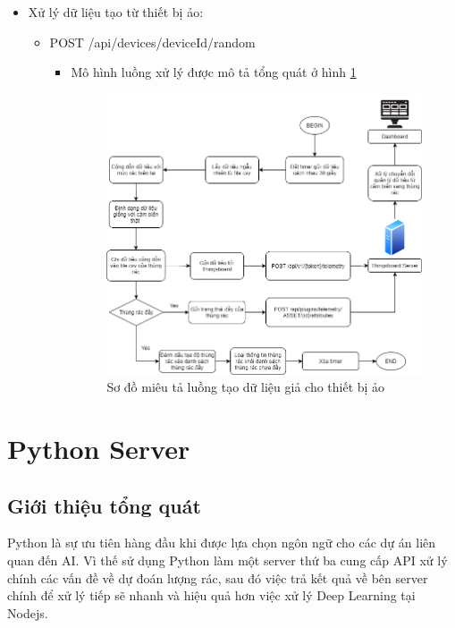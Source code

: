 \begin{itemize}
    \item Xử lý dữ liệu tạo từ thiết bị ảo:
    \begin{itemize}
        \item POST /api/devices/{deviceId}/random
        \begin{itemize}    
            \item Mô hình luồng xử lý được mô tả tổng quát ở hình \ref{fig:random_telemetry}
            \begin{figure}[H]
                \centering
                \includegraphics[width=\textwidth]{images/Khanh/Nodejs/Server_Random_Telemetry.png}
                \caption{Sơ đồ miêu tả luồng tạo dữ liệu giả cho thiết bị ảo}
                \label{fig:random_telemetry}
            \end{figure}
        \end{itemize}
    \end{itemize}

\end{itemize}

\section{Python Server}
\subsection{Giới thiệu tổng quát}
Python là sự ưu tiên hàng đầu khi được lựa chọn ngôn ngữ cho các dự án liên quan đến AI. Vì thế sử dụng Python làm một server thứ ba cung cấp API xử lý chính các vấn đề về dự đoán lượng rác, sau đó việc trả kết quả về bên server chính để xử lý tiếp sẽ nhanh và hiệu quả hơn việc xử lý Deep Learning tại Nodejs.

